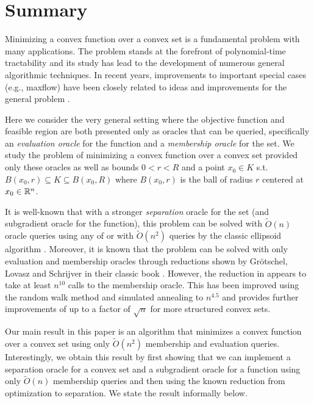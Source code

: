 
\section{Summary}

Minimizing a convex function over a convex set is a fundamental problem
with many applications. The problem stands at the forefront of polynomial-time
tractability and its study has lead to the development of numerous
general algorithmic techniques. In recent years, improvements to important
special cases (e.g., maxflow) have been closely related to ideas and
improvements for the general problem \citep{christiano2011electrical,sherman2013nearly,madry2013navigating,kelner2014almost,lee2013new,lee2014path,lee2015efficient,lee2015faster,DBLP:conf/stoc/Sherman17}. 

Here we consider the very general setting where the objective function
and feasible region are both presented only as oracles that can be
queried, specifically an \emph{evaluation oracle} for the function
and a \emph{membership oracle} for the set. We study the problem of
minimizing a convex function over a convex set provided only these
oracles as well as bounds $0<r<R$ and a point $x_{0}\in K$ s.t.
$B(x_{0},r)\subseteq K\subseteq B(x_{0},R)$ where $B(x_{0},r)$ is
the ball of radius $r$ centered at $x_{0}\in\mathbb{R}^{n}$. 

It is well-known that with a stronger \emph{separation} oracle for
the set (and subgradient oracle for the function), this problem can
be solved with $\tilde{O}(n)$ oracle queries using any of \cite{Va96,BV04,lee2015faster}
or with $\tilde{O}(n^{2})$ queries by the classic ellipsoid algorithm
\cite{GLS}. Moreover, it is known that the problem can be solved
with only evaluation and membership oracles through reductions shown
by Gr\"{o}tschel, Lovasz and Schrijver in their classic book \cite{GLS}.
However, the reduction in \cite{GLS} appears to take at least $n^{10}$
calls to the membership oracle. This has been improved using the random
walk method and simulated annealing to $n^{4.5}$ \cite{KV06,LV06}
and  \cite{AbernethyH16}  provides further improvements of up to
a factor of $\sqrt{n}$ for more structured convex sets. 

Our main result in this paper is an algorithm that minimizes a convex
function over a convex set using only $\tilde{O}(n^{2})$ membership
and evaluation queries. Interestingly, we obtain this result by first
showing that we can implement a separation oracle for a convex set
and a subgradient oracle for a function using only $\tilde{O}(n)$
membership queries and then
using the known reduction from optimization to separation.
We state the result informally below. 


